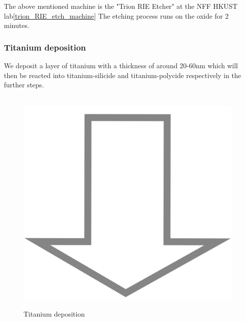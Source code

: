 The above mentioned machine is the "Trion RIE Etcher" at the NFF HKUST lab\autoref{trion_RIE_etch_machine}
The etching process runs on the oxide for 2 minutes.

\newpage

\subsubsection{Titanium deposition}

We deposit a layer of titanium with a thickness of around 20-60nm which will then be reacted into titanium-silicide and titanium-polycide respectively in the further steps.

\begin{figure}[H]
	\centering
	\begin{tikzpicture}[node distance = 3cm, auto, thick,scale=\CrossSectionOnly, every node/.style={transform shape}]
		
	\end{tikzpicture}\\
	\includegraphics[scale=0.01]{down_arrow.png}\\
	\begin{tikzpicture}[node distance = 3cm, auto, thick,scale=\CrossSectionOnly, every node/.style={transform shape}]
		
	\end{tikzpicture}
	\caption{Titanium deposition}
\end{figure}

